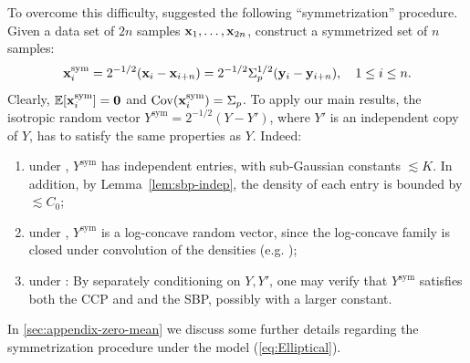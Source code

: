 \documentclass[times,sort&compress,3p]{elsarticle}
\begin{document}
To overcome this difficulty, \cite{dumbgen1998tyler} suggested the following ``symmetrization'' procedure. Given a data set of $2n$ samples ${\bf x}_1,\ldots,{\bf x}_{2n}$, 
construct a symmetrized set of $n$ samples: 
\[
{\bf x}^{\mathrm{sym}}_i = 2^{-1/2}({\bf x}_i-{\bf x}_{i+n})=2^{-1/2}\Sigma_p^{1/2}({\bf y}_i-{\bf y}_{i+n}), \quad 1\le i \le n.
\]
 Clearly, ${\mathbb{E}}[{\bf x}^{\mathrm{sym}}_i]=\bm{0}$ and $\mathrm{Cov}({\bf x}^{\mathrm{sym}}_i)=\Sigma_p$. 
 To apply our main results, the isotropic random vector ${Y}^{\mathrm{sym}}=2^{-1/2}(Y-Y')$,
 where $Y'$ is an independent copy of $Y$, has to satisfy the same properties as $Y$. Indeed: 
 \begin{enumerate}
     \item under \AssumIndep, ${Y}^{\mathrm{sym}}$ has independent entries, with sub-Gaussian constants $\lesssim K$. In addition, by Lemma~\ref{lem:sbp-indep}, the density of each entry is bounded by $\lesssim C_0$; 
     
     \item under \AssumLC, ${Y}^{\mathrm{sym}}$ is a log-concave random vector, since the log-concave family is closed under convolution of the densities (e.g. \cite{saumard2014log});
     
     \item under \AssumCCPSB:
    By separately conditioning on $Y,Y'$, one may verify that ${Y}^{\mathrm{sym}}$ satisfies both the CCP and and the SBP, possibly with a larger constant.
 \end{enumerate}
 
 In \ref{sec:appendix-zero-mean} we discuss some further details regarding the symmetrization procedure under the model  (\ref{eq:Elliptical}).
\end{document}
